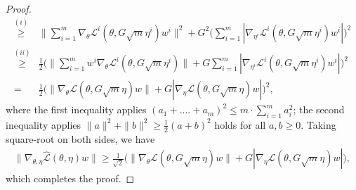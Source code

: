 \documentclass[twoside]{article} %
\theoremstyle{plain}
\theoremstyle{definition}
\theoremstyle{remark}
\newtheorem{remark}[theorem]{Remark}
\newcommand{\fL}{\mathcal{L}}
\newcommand{\fhL}{\hat{\mathcal{L}}}
\begin{document}
\begin{proof}
\begin{align}
     \overset{(i)}{\geq}& \| \sum_{i=1}^{m}\nabla_{{\theta}}\fL^i({\theta},G\sqrt{m}\eta^i)w^i\|^2+{G^2}\big(\sum_{i=1}^{m}|\nabla_{\eta^i}\fL^i({\theta}, G\sqrt{m}\eta^i)w^i|\big)^2\nonumber\\
    \overset{(ii)}{\geq}& \frac{1}{2}\Big(\| \sum_{i=1}^{m}w^i \nabla_{{\theta}}\fL^i({\theta}, G\sqrt{m}\eta^i)\|+{G}\sum_{i=1}^{m}| \nabla_{\eta^i}\fL^i({\theta},G\sqrt{m}\eta^i)w^i| \Big)^2\nonumber\\
    =&\frac{1}{2}\Big(\| \nabla_{{\theta}}\fL({\theta}, G\sqrt{m}\eta)w\|+{G}| \nabla_{\eta}\fL({\theta}, G\sqrt{m}\eta)w| \Big)^2,
\end{align}
where the first inequality applies $(a_1+....+a_m)^2\leq m\cdot \sum_{i=1}^{m}a_i^2$; the second inequality applies $\|a\|^2+\|b\|^2\geq \frac{1}{2}(a+b)^2$ holds for all $a,b\geq 0$. Taking square-root on both sides, we have
\begin{align}
    \|\nabla_{{\theta}, {\eta}}\fhL({\theta}, {\eta}){w} \|\geq \frac{1}{\sqrt{2}}\Big(\| \nabla_{{\theta}}\fL({\theta}, G\sqrt{m}\eta)w\|+{G} |\nabla_{\eta}\fL({\theta}, G\sqrt{m}\eta)w| \Big),\nonumber
\end{align}
which completes the proof.
\end{proof}

    
\end{document}
